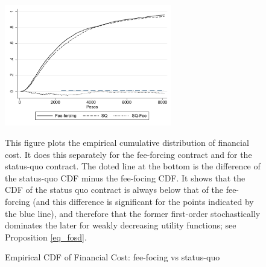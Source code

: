 \documentclass[oneside,11pt]{article}
\begin{document}
\vspace{.2in}
\begin{figure}[H]
        \caption{Empirical CDF of Financial Cost: fee-focing vs status-quo}
    \label{ecdf_fc}
    \begin{center}
        \centering
        \includegraphics[width=0.65\textwidth]{Figuras/cdf_fc_pro_2.pdf}
    \end{center}
    \scriptsize This figure plots the empirical cumulative distribution of financial cost. It does this separately for the fee-forcing contract and for the status-quo contract. The doted line at the bottom is the difference of the status-quo CDF minus the fee-focing CDF. It shows that the CDF of the status quo contract is always below that of the fee-forcing (and this difference is significant for the points indicated by the blue line), and therefore that the former first-order stochastically dominates the later for weakly decreasing utility functions; see Proposition \ref{eq_fosd}.
\end{figure}
\end{document}
